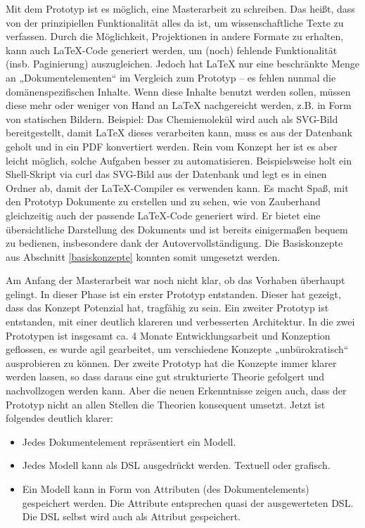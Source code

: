 Mit dem Prototyp ist es möglich, eine Masterarbeit zu schreiben. Das heißt, dass von der prinzipiellen Funktionalität alles da ist, um wissenschaftliche Texte zu verfassen. Durch die Möglichkeit, Projektionen in andere Formate zu erhalten, kann auch LaTeX-Code generiert werden, um (noch) fehlende Funktionalität (insb. Paginierung) auszugleichen. Jedoch hat LaTeX nur eine beschränkte Menge an „Dokumentelementen“ im Vergleich zum Prototyp -- es fehlen nunmal die domänenspezifischen Inhalte. Wenn diese Inhalte benutzt werden sollen, müssen diese mehr oder weniger von Hand an LaTeX nachgereicht werden, z.B. in Form von statischen Bildern. Beispiel: Das Chemiemolekül wird auch als SVG-Bild bereitgestellt, damit LaTeX dieses verarbeiten kann, muss es aus der Datenbank geholt und in ein PDF konvertiert werden. Rein vom Konzept her ist es aber leicht möglich, solche Aufgaben besser zu automatisieren. Beispielsweise holt ein Shell-Skript via curl das SVG-Bild aus der Datenbank und legt es in einen Ordner ab, damit der LaTeX-Compiler es verwenden kann. Es macht Spaß, mit den Prototyp Dokumente zu erstellen und zu sehen, wie von Zauberhand gleichzeitig auch der passende LaTeX-Code generiert wird. Er bietet eine übersichtliche Darstellung des Dokuments und ist bereits einigermaßen bequem zu bedienen, insbesondere dank der Autovervollständigung. Die Basiskonzepte aus Abschnitt \ref{basiskonzepte} konnten somit umgesetzt werden.

 
Am Anfang der Masterarbeit war noch nicht klar, ob das Vorhaben überhaupt gelingt. In dieser Phase ist ein erster Prototyp entstanden. Dieser hat gezeigt, dass das Konzept Potenzial hat, tragfähig zu sein. Ein zweiter Prototyp ist entstanden, mit einer deutlich klareren und verbesserten Architektur. In die zwei Prototypen ist insgesamt ca. 4 Monate Entwicklungsarbeit und Konzeption geflossen, es wurde agil gearbeitet, um verschiedene Konzepte „unbürokratisch“ ausprobieren zu können. Der zweite Prototyp hat die Konzepte immer klarer werden lassen, so dass daraus eine gut strukturierte Theorie gefolgert und nachvollzogen werden kann. Aber die neuen Erkenntnisse zeigen auch, dass der Prototyp nicht an allen Stellen die Theorien konsequent umsetzt. Jetzt ist folgendes deutlich klarer:

 
\begin{itemize}

\item Jedes Dokumentelement repräsentiert ein Modell.
\item Jedes Modell kann als DSL ausgedrückt werden. Textuell oder grafisch.
\item Ein Modell kann in Form von Attributen (des Dokumentelements) gespeichert werden. Die Attribute entsprechen quasi der ausgewerteten DSL. Die DSL selbst wird auch als Attribut gespeichert.
\end{itemize}
 
